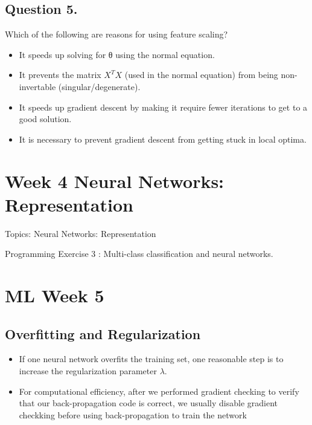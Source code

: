 \subsection{ Question 5.} 
Which of the following are reasons for using feature scaling?

\begin{itemize}
\item It speeds up solving for θ using the normal equation.
\item It prevents the matrix $X^TX$ (used in the normal equation) from being non-invertable (singular/degenerate).
\item It speeds up gradient descent by making it require fewer iterations to get to a good solution.
\item It is necessary to prevent gradient descent from getting stuck in local optima.
\end{itemize}

\newpage
\section{Week 4 Neural Networks: Representation}


Topics: Neural Networks: Representation

Programming Exercise 3 : Multi-class classification and neural networks.


\section{ML Week 5}
\subsection*{Overfitting and Regularization}

\begin{itemize}
\item If one neural network overfits the training set, one reasonable step is to
increase the regularization parameter $\lambda$.
\item For computational efficiency, after we performed gradient checking to verify that our back-propagation 
code is correct, we usually disable gradient checkking before using back-propagation to train
the network
\end{itemize}

